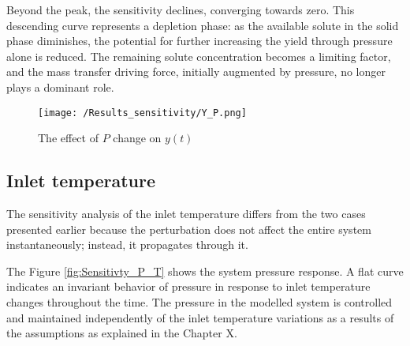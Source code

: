 \documentclass[../Article_Sensitivity_Analsysis.tex]{subfiles}
\begin{document}
	Beyond the peak, the sensitivity declines, converging towards zero. This descending curve represents a depletion phase: as the available solute in the solid phase diminishes, the potential for further increasing the yield through pressure alone is reduced. The remaining solute concentration becomes a limiting factor, and the mass transfer driving force, initially augmented by pressure, no longer plays a dominant role.


	\begin{figure}[h!]
		\centering
		\texttt{[image: /Results\_sensitivity/Y\_P.png]}
		\caption{The effect of $P$ change on $y(t)$}
		\label{fig:Sensitivty_P_y}
	\end{figure}

	\subsection{Inlet temperature}
	
	The sensitivity analysis of the inlet temperature differs from the two cases presented earlier because the perturbation does not affect the entire system instantaneously; instead, it propagates through it.
	
	The Figure \ref{fig:Sensitivty_P_T} shows the system pressure response. A flat curve indicates an invariant behavior of pressure in response to inlet temperature changes throughout the time. The pressure in the modelled system is controlled and maintained independently of the inlet temperature variations as a results of the assumptions as explained in the Chapter X.
	
\end{document}
